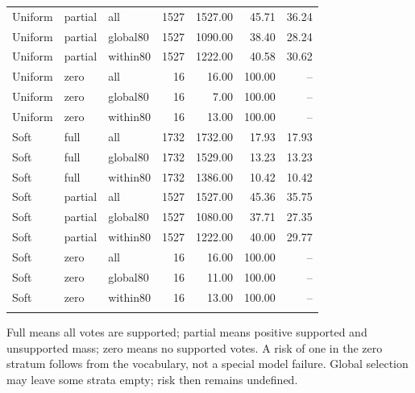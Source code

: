 \documentclass[10pt]{article}
\begin{document}
\begin{longtable}{lllrrrr}
Uniform & partial & all & 1527 & 1527.00 & 45.71 & 36.24\\
Uniform & partial & global80 & 1527 & 1090.00 & 38.40 & 28.24\\
Uniform & partial & within80 & 1527 & 1222.00 & 40.58 & 30.62\\
Uniform & zero & all & 16 & 16.00 & 100.00 & --\\
Uniform & zero & global80 & 16 & 7.00 & 100.00 & --\\
Uniform & zero & within80 & 16 & 13.00 & 100.00 & --\\
\addlinespace
Soft & full & all & 1732 & 1732.00 & 17.93 & 17.93\\
Soft & full & global80 & 1732 & 1529.00 & 13.23 & 13.23\\
Soft & full & within80 & 1732 & 1386.00 & 10.42 & 10.42\\
Soft & partial & all & 1527 & 1527.00 & 45.36 & 35.75\\
Soft & partial & global80 & 1527 & 1080.00 & 37.71 & 27.35\\
Soft & partial & within80 & 1527 & 1222.00 & 40.00 & 29.77\\
Soft & zero & all & 16 & 16.00 & 100.00 & --\\
Soft & zero & global80 & 16 & 11.00 & 100.00 & --\\
Soft & zero & within80 & 16 & 13.00 & 100.00 & --\\
\addlinespace
\bottomrule\end{longtable}
Full means all votes are supported; partial means positive supported and unsupported mass; zero means no supported votes. A risk of one in the zero stratum follows from the vocabulary, not a special model failure. Global selection may leave some strata empty; risk then remains undefined.
\clearpage
\end{document}
